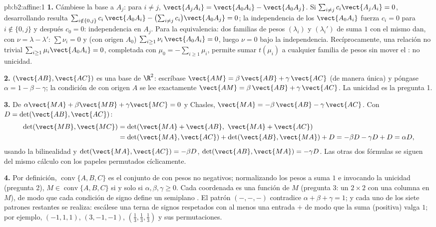 \begin{solution}{pb:b2:affine:1}
\textbf{1.} Cámbiese la base a $A_j$: para $i \neq j$, $\vect{A_jA_i}
= \vect{A_0A_i} - \vect{A_0A_j}$. Si $\sum_{i \neq j}
c_i\vect{A_jA_i} = 0$, desarrollando resulta $\sum_{i \notin \{0,
j\}} c_i\,\vect{A_0A_i} - \bigl(\sum_{i\neq j}
c_i\bigr)\vect{A_0A_j} = 0$; la independencia de los $\vect{A_0A_i}$
fuerza $c_i = 0$ para $i \notin \{0, j\}$ y después $c_0 = 0$:
independencia en $A_j$. Para la equivalencia: dos familias de pesos
$(\lambda_i)$ y $(\lambda_i')$ de suma $1$ con el mismo 
dan, con $\nu = \lambda - \lambda'$: $\sum\nu_i = 0$ y (con origen
$A_0$) $\sum_{i \geq 1}\nu_i\,\vect{A_0A_i} = 0$, luego $\nu = 0$
bajo la independencia. Recíprocamente, una relación no trivial
$\sum_{i\geq1}\mu_i \vect{A_0A_i} = 0$, completada con $\mu_0 =
-\sum_{i\geq1} \mu_i$, permite sumar $t(\mu_i)$ a cualquier familia
de pesos sin mover el : no unicidad.

\textbf{2.} $(\vect{AB}, \vect{AC})$ es una base de $\R^2$:
escríbase $\vect{AM} = \beta\,\vect{AB} + \gamma\,\vect{AC}$ (de
manera única) y póngase $\alpha = 1 - \beta - \gamma$; la condición
de  con origen $A$ se lee exactamente $\vect{AM} =
\beta\,\vect{AB} + \gamma\,\vect{AC}$. La unicidad es la pregunta 1.

\textbf{3.} De $\alpha\vect{MA} + \beta\vect{MB} + \gamma\vect{MC} =
0$ y Chasles, $\vect{MA} = -\beta\,\vect{AB} - \gamma\,\vect{AC}$.
Con $D = \det(\vect{AB}, \vect{AC})$:
\begin{align*}
\det(\vect{MB}, \vect{MC})
&= \det(\vect{MA} + \vect{AB},\ \vect{MA} + \vect{AC})\\
&= \det(\vect{MA}, \vect{AC}) + \det(\vect{AB}, \vect{MA}) +
D = -\beta D - \gamma D + D = \alpha D,
\end{align*}
usando la bilinealidad y $\det(\vect{MA}, \vect{AC}) = -\beta D$,
$\det(\vect{AB}, \vect{MA}) = -\gamma D$. Las otras dos fórmulas se
siguen del mismo cálculo con los papeles permutados cíclicamente.

\textbf{4.} Por definición, $\operatorname{conv}\{A, B, C\}$ es el
conjunto de  con pesos no negativos; normalizando los
pesos a suma $1$ e invocando la unicidad (pregunta 2), $M \in
\operatorname{conv}\{A,B,C\}$ si y solo si $\alpha, \beta, \gamma
\geq 0$. Cada coordenada es una función  de $M$ (pregunta 3: un
 $2\times2$ con una columna  en $M$), de modo que cada
condición  de signo define un semiplano . El patrón
$(-,-,-)$ contradice $\alpha + \beta + \gamma = 1$; y cada uno de los
siete patrones restantes se realiza: escálese una terna de signos
respetados con al menos una entrada $+$ de modo que la suma
(positiva) valga $1$; por ejemplo, $(-1, 1, 1)$, $(3, -1, -1)$,
$(\frac13, \frac13, \frac13)$ y sus permutaciones.


\end{solution}
